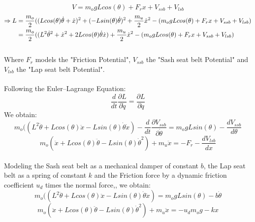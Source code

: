 \documentclass[10pt,a4paper]{article}
\begin{document}
\begin{equation}
V=m_{o}gLcos(\theta)+F_{r}x+V_{ssb}+V_{lsb}
\end{equation}
\begin{align}
\Rightarrow L & =\dfrac{m_{o}}{2}((Lcos(\theta)\dot \theta + \dot x)^{2}+(-Lsin(\theta)\dot \theta)^{2}+\dfrac{m_{u}}{2}\dot x^{2}
-(m_{o}gLcos(\theta)+F_{r}x+V_{ssb}+V_{lsb})\notag\\ 
& =\dfrac{m_{o}}{2}((L^{2}\dot \theta^{2} + \dot x^{2}+2Lcos(\theta)\dot \theta\dot x)+\dfrac{m_{u}}{2}\dot x^{2}
-(m_{o}gLcos(\theta)+F_{r}x+V_{ssb}+V_{lsb})
\end{align}
\\
Where $F_{r}$ models the "Friction Potential", $ V_{ssb} $ the "Sash seat belt Potential" and $ V_{lsb} $ the "Lap seat belt Potential".
\\\\
Following the Euler--Lagrange Equation:
\begin{equation}
\dfrac{d}{dt}\dfrac{\partial L}{\partial \dot q}=\dfrac{\partial L}{\partial  q}
\end{equation}
We obtain:
\begin{equation}
m_{o}((L^{2}\ddot \theta +Lcos(\theta)\ddot x -Lsin(\theta)\dot \theta\dot x)-\dfrac {d}{d t}\dfrac {\partial V_{ssb}}{\partial\dot\theta}=
m_{o}gLsin(\theta)-\dfrac {dV_{ssb}}{d\theta}
\end{equation}
\begin{equation}
m_{o}(\ddot x+Lcos(\theta)\ddot \theta-Lsin(\theta)\dot \theta^{2})+m_{u}\ddot x=-F_{r}-\dfrac {dV_{lsb}}{dx}
\end{equation}
 \\Modeling the Sash seat belt as a mechanical damper of constant $b$, the Lap seat belt as a spring of constant $k$ and the Friction force by a dynamic friction coefficient $u_{d}$ times the normal force,, we obtain:
 \begin{equation}
 m_{o}((L^{2}\ddot \theta +Lcos(\theta)\ddot x -Lsin(\theta)\dot \theta\dot x)=
m_{o}gLsin(\theta)-b\dot \theta
 \end{equation}
\begin{equation}
m_{o}(\ddot x+Lcos(\theta)\ddot \theta-Lsin(\theta)\dot \theta^{2})+m_{u}\ddot x=-u_{d}m_{o}g-kx
\end{equation}
\end{document}
